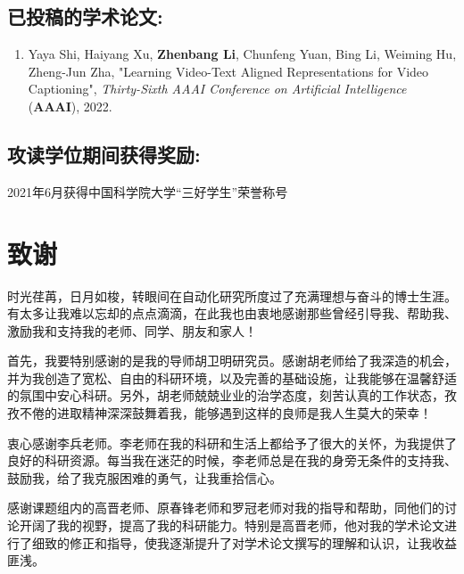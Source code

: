 \section*{已投稿的学术论文:}

{
\setlist[enumerate]{}%
\begin{enumerate}[nosep]
    \item Yaya Shi, Haiyang Xu, \textbf{Zhenbang Li}, Chunfeng Yuan, Bing Li, Weiming Hu, Zheng-Jun Zha, "Learning Video-Text Aligned Representations for Video Captioning", \textit{Thirty-Sixth AAAI Conference on Artificial Intelligence} (\textbf{AAAI}), 2022.
\end{enumerate}
}

\section*{攻读学位期间获得奖励:}
2021年6月获得中国科学院大学“三好学生”荣誉称号

\chapter[致谢]{致\quad 谢}%
\thispagestyle{noheaderstyle}%

时光荏苒，日月如梭，转眼间在自动化研究所度过了充满理想与奋斗的博士生涯。有太多让我难以忘却的点点滴滴，在此我也由衷地感谢那些曾经引导我、帮助我、激励我和支持我的老师、同学、朋友和家人！

首先，我要特别感谢的是我的导师胡卫明研究员。感谢胡老师给了我深造的机会，并为我创造了宽松、自由的科研环境，以及完善的基础设施，让我能够在温馨舒适的氛围中安心科研。另外，胡老师兢兢业业的治学态度，刻苦认真的工作状态，孜孜不倦的进取精神深深鼓舞着我，能够遇到这样的良师是我人生莫大的荣幸！

衷心感谢李兵老师。李老师在我的科研和生活上都给予了很大的关怀，为我提供了良好的科研资源。每当我在迷茫的时候，李老师总是在我的身旁无条件的支持我、鼓励我，给了我克服困难的勇气，让我重拾信心。

感谢课题组内的高晋老师、原春锋老师和罗冠老师对我的指导和帮助，同他们的讨论开阔了我的视野，提高了我的科研能力。特别是高晋老师，他对我的学术论文进行了细致的修正和指导，使我逐渐提升了对学术论文撰写的理解和认识，让我收益匪浅。



